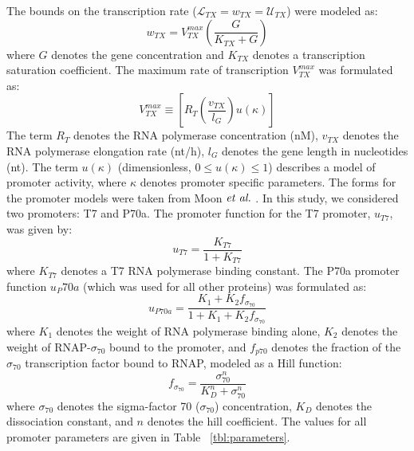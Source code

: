 \documentclass[journal=asbcd6,manuscript=article]{achemso}
\begin{document}
The bounds on the transcription rate ($\mathcal{L}_{TX}=w_{TX}=\mathcal{U}_{TX}$) were modeled as:
\begin{equation}
	w_{TX} = V_{TX}^{max}\left(\frac{G}{K_{TX}+G}\right)
\end{equation}
where $G$ denotes the gene concentration and $K_{TX}$ denotes a transcription saturation coefficient.
The maximum rate of transcription $V_{TX}^{max}$ was formulated as:
\begin{equation}
	V_{TX}^{max} \equiv \left[R_{T}\left(\frac{v_{TX}}{l_{G}}\right)u\left(\kappa\right)\right]
\end{equation}
The term $R_{T}$ denotes the RNA polymerase concentration (nM),
$v_{TX}$ denotes the RNA polymerase elongation rate (nt/h),
$l_{G}$ denotes the gene length in nucleotides (nt).
The term $u\left(\kappa\right)$ (dimensionless, $0\leq u\left(\kappa\right)\leq 1$) describes a model of promoter activity, where $\kappa$ denotes promoter specific parameters.
The forms for the promoter models were taken from Moon $\emph{et~al.}$ \cite{Moon:2012ab}.
In this study, we considered two promoters: T7 and P70a.
The promoter function for the T7 promoter, $u_{T7}$, was given by:
\begin{equation}
	u_{T7} = \frac{K_{T7}}{1 + K_{T7}}
\end{equation}
where $K_{T7}$ denotes a T7 RNA polymerase binding constant.
The P70a promoter function $u_P70a$ (which was used for all other proteins) was formulated as:
\begin{equation}
	u_{P70a} = \frac{K_{1}+K_{2}f_{\sigma_{70}}}{1 + K_{1}+K_{2}f_{\sigma_{70}}}
\end{equation}
where $K_{1}$ denotes the weight of RNA polymerase binding alone,
$K_{2}$ denotes the weight of RNAP-$\sigma_{70}$ bound to the promoter,
and $f_{p70}$ denotes the fraction of the $\sigma_{70}$ transcription factor bound to RNAP, modeled as a Hill function: 
\begin{equation}
	f_{\sigma_{70}} = \frac{\sigma_{70}^{n}}{K_{D}^{n} + \sigma_{70}^{n}}
\end{equation}
where $\sigma_{70}$ denotes the sigma-factor 70 ($\sigma_{70}$) concentration, $K_{D}$ denotes the dissociation constant, and $n$ denotes the hill coefficient.
The values for all promoter parameters are given in Table ~\ref{tbl:parameters}.
\end{document}
